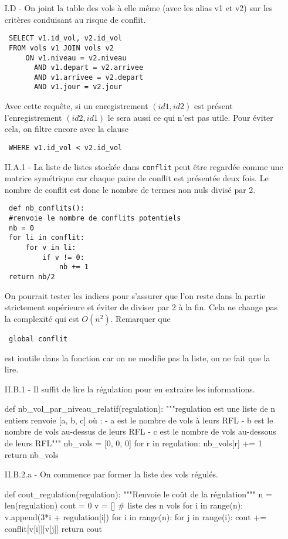 \begin{itemize}
\item[I.D - ] On joint la table des vols à elle même (avec les alias v1 et v2) sur les critères conduisant au risque de conflit.
\begin{verbatim}
 SELECT v1.id_vol, v2.id_vol
 FROM vols v1 JOIN vols v2 
     ON v1.niveau = v2.niveau 
       AND v1.depart = v2.arrivee 
       AND v1.arrivee = v2.depart
       AND v1.jour = v2.jour
\end{verbatim}
Avec cette requête, si un enregistrement $(id1,id2)$ est présent l'enregistrement $(id2,id1)$ le sera aussi ce qui n'est pas utile. Pour éviter cela, on filtre encore avec la clause
\begin{verbatim}
 WHERE v1.id_vol < v2.id_vol
\end{verbatim}

\item[II.A.1 - ] La liste de listes stockée dans \texttt{conflit} peut être regardée comme une matrice symétrique car chaque paire de conflit est présentée deux fois. Le nombre de conflit est donc le nombre de termes non nuls divisé par 2.
\begin{verbatim}
 def nb_conflits():
 #renvoie le nombre de conflits potentiels 
 nb = 0 
 for li in conflit:
     for v in li:
         if v != 0:
             nb += 1
 return nb/2
\end{verbatim}
On pourrait tester les indices pour s'assurer que l'on reste dans la partie strictement supérieure et éviter de diviser par 2 à la fin. Cela ne change pas la complexité qui est $O(n^2)$.\newline
Remarquer que 
\begin{verbatim}
 global conflit
\end{verbatim}
est inutile dans la fonction car on ne modifie pas la liste, on ne fait que la lire.

\item[II.B.1 - ] Il suffit de lire la régulation pour en extraire les informations.
\begin{python}
def nb_vol_par_niveau_relatif(regulation):
    """regulation est une liste de n entiers
    renvoie [a, b, c] où :
      - a est le nombre de vols à leurs RFL
      - b est le nombre de vols au-dessus de leurs RFL
      - c est le nombre de vols au-dessous de leurs RFL"""
    nb_vols = [0, 0, 0]
    for r in regulation: 
        nb_vols[r] += 1
    return nb_vols
\end{python}
 

\item[II.B.2.a - ] On commence par former la liste des vols régulés.
\begin{python}
def cout_regulation(regulation):
    """Renvoie le coût de la régulation"""
    n = len(regulation)
    cout = 0
    v = [] # liste des n vols
    for i in range(n): 
        v.append(3*i + regulation[i])
    for i in range(n):
        for j in range(i):
            cout += conflit[v[i]][v[j]]
    return cout
\end{python}
 


\end{itemize}
